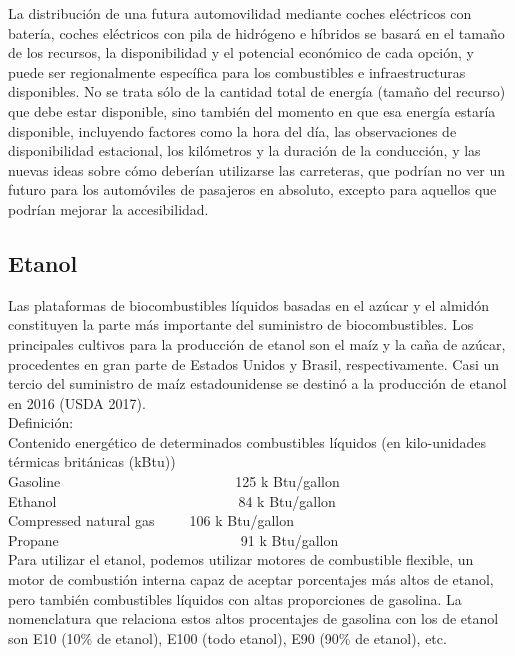 \documentclass[runningheads]{llncs}
\begin{document}
La distribución de una futura automovilidad mediante coches eléctricos con batería, coches eléctricos con pila de hidrógeno e híbridos se basará en el tamaño de los recursos, la disponibilidad y el potencial económico de cada opción, y puede ser regionalmente específica para los combustibles e infraestructuras disponibles. No se trata sólo de la cantidad total de energía (tamaño del recurso) que debe estar disponible, sino también del momento en que esa energía estaría disponible, incluyendo factores como la hora del día, las observaciones de disponibilidad estacional, los kilómetros y la duración de la conducción, y las nuevas ideas sobre cómo deberían utilizarse las carreteras, que podrían no ver un futuro para los automóviles de pasajeros en absoluto, excepto para aquellos que podrían mejorar la accesibilidad.

\subsection{Etanol}
Las plataformas de biocombustibles líquidos basadas en el azúcar y el almidón constituyen la parte más importante del suministro de biocombustibles. Los principales cultivos para la producción de etanol son el maíz y la caña de azúcar, procedentes en gran parte de Estados Unidos y Brasil, respectivamente. Casi un tercio del suministro de maíz estadounidense se destinó a la producción de etanol en 2016 (USDA 2017). \\

Definición: \\
Contenido energético de determinados combustibles líquidos (en kilo-unidades térmicas británicas (kBtu))\\
Gasoline~~~~~~~~~~~~~~~~~~~~~~~~~125 k Btu/gallon\\
Ethanol~~~~~~~~~~~~~~~~~~~~~~~~~~84 k Btu/gallon\\
Compressed natural gas~~~~~106 k Btu/gallon\\
Propane~~~~~~~~~~~~~~~~~~~~~~~~~~91 k Btu/gallon\\

Para utilizar el etanol, podemos utilizar motores de combustible flexible, un motor de combustión interna capaz de aceptar porcentajes más altos de etanol, pero también combustibles líquidos con altas proporciones de gasolina.  La nomenclatura que relaciona estos altos procentajes de gasolina con los de etanol son E10 (10\% de etanol), E100 (todo etanol), E90 (90\% de etanol), etc. \\
\end{document}

